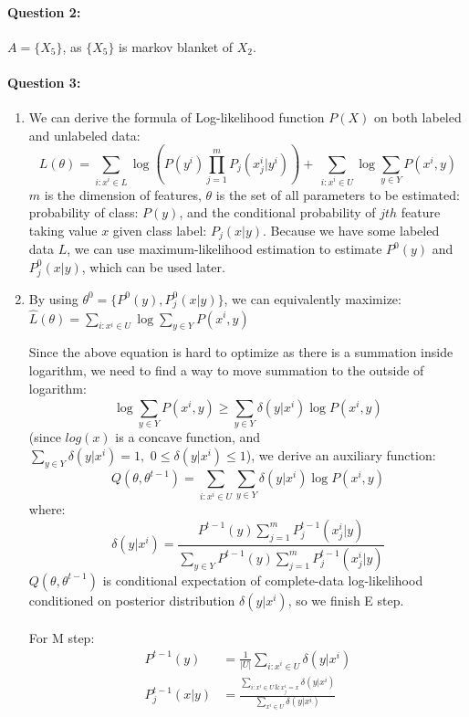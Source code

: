 \documentclass[letterpaper,11pt]{article}
\begin{document}
\paragraph{Question 2:}
$A = \{X_5\}$, as $\{X_5\}$ is markov blanket of $X_2$.

\paragraph{Question 3:}
\begin{enumerate}
\item We can derive the formula of Log-likelihood function $P(X)$ on both labeled and unlabeled data:
\begin{equation}
L(\theta) = \sum_{i:x^i\in L}^{}{\log{\left( P(y^i) \prod_{j=1}^{m}{P_j(x^i_j | y^i)} \right)}} + \
            \sum_{i:x^i\in U}^{}{\log{\sum_{y\in Y}^{}{P(x^i,y)}}}
\end{equation}
$m$ is the dimension of features, $\theta$ is the set of all parameters to be estimated: probability of class: $P(y)$, and the conditional probability of $jth$ feature taking value $x$ given class label: $P_j(x | y)$. Because we have some labeled data $L$, we can use maximum-likelihood estimation to estimate $P^0(y)$ and $P^0_j(x | y)$, which can be used later. 

\item By using ${\theta}^0=\{P^0(y),P^0_j(x | y) \}$, we can equivalently maximize: $\hat{L}(\theta) = \sum_{i:x^i\in U}^{}{\log{\sum_{y\in Y}^{}{P(x^i,y)}}}$


Since the above equation is hard to optimize as there is a summation inside logarithm, we need to find a way to move summation to the outside of logarithm:
\begin{equation}
\log{\sum_{y\in Y}^{}{{P(x^i, y)}}} \ge \sum_{y\in Y}^{}{\delta(y|x^i)\log{P(x^i,y)}}
\end{equation}
(since $log(x)$ is a concave function, and $\sum_{y\in Y}^{}{\delta(y|x^i)}=1,\,\, 0 \le \delta(y|x^i)\le 1$), we derive an auxiliary function: 
\begin{equation}
Q(\theta, {\theta}^{t-1}) = \sum_{i:x^i\in U}^{}{\sum_{y\in Y}^{}{\delta(y|x^i)\log{P(x^i,y)}}}
\end{equation}
where:
\begin{equation}\label{MStep}
\delta(y|x^i) = \frac{P^{t-1}(y) \sum_{j=1}^{m}{P^{t-1}_j(x_j^i | y)}   }{\sum_{y\in Y}^{}{P^{t-1}(y) \sum_{j=1}^{m}{P^{t-1}_j(x_j^i | y)}}}
\end{equation}
$Q(\theta, {\theta}^{t-1})$ is conditional expectation of complete-data log-likelihood conditioned on posterior distribution $\delta(y|x^i)$, so we finish E step. 
\\
\\
For M step:
\begin{align}
P^{t-1}(y) & = \frac{1}{|U|}\sum_{i:x^i\in U}^{}{\delta(y|x^i)} \\
P^{t-1}_j(x | y) & = \frac{\sum_{i:x^i\in U\,\&\,x_j^i=x}^{}{\delta(y|x^i)}}{\sum_{x^i\in U}^{}{\delta(y|x^i)}}
\end{align}

\end{enumerate}
\end{document}
